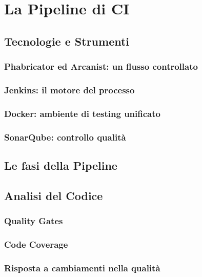 \documentclass[a4paper,12pt]{report}
\begin{document}
	\chapter{La Pipeline di CI}
	
	\section{Tecnologie e Strumenti}
	
	\subsection{Phabricator ed Arcanist: un flusso controllato}
	
	\subsection{Jenkins: il motore del processo}
	
	\subsection{Docker: ambiente di testing unificato}
	
	\subsection{SonarQube: controllo qualità}
	
	\section{Le fasi della Pipeline}
	
	\section{Analisi del Codice}
	
	\subsection{Quality Gates}
	
	\subsection{Code Coverage}
	
	\subsection{Risposta a cambiamenti nella qualità}
	
\end{document}

